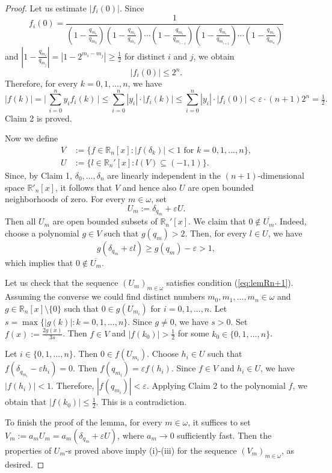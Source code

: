 \documentclass[preprint,11pt]{elsarticle}
\theoremstyle{definition}
\theoremstyle{remark}
\numberwithin{equation}{section}
\numberwithin{theorem}{section}
\newcommand{\e}{\varepsilon}
\newcommand{\w}{\omega}
\newcommand{\IR}{\mathbb{R}}
\def\om{\omega}
\begin{document}
\begin{proof}
Let us estimate $|f_i(0)|$. Since
\[
f_i(0) =\frac{1}
{(1-\frac{q_{m_i}}{q_{m_0}})(1-\frac{q_{m_i}}{q_{m_1}})\cdots(1-\frac{q_{m_i}}{ q_{m_{i-1}}})(1-\frac{q_{m_i}}{q_{m_{i+1}}})\cdots(1-\frac{q_{m_i}}{q_{m_{n}}})}
\]
and $|1-\tfrac{q_{m_i}}{q_{m_j}}|=|1-2^{m_i-m_j}|\geq \frac{1}{2}$ for distinct $i$ and $j$, we obtain
\[
|f_i(0)|\leq 2^{n}.
\]
Therefore, for every $k=0,1,...,n$, we have
\[
|f(k)| = \Big|\, \sum_{i=0}^n y_i f_i(k) \,\Big| \leq \sum_{i=0}^n |y_i| \cdot|f_i(k)| \leq \sum_{i=0}^n |y_i|\cdot |f_i(0)| < \e \cdot (n+1) 2^n
= \tfrac{1}{2}.
\]
Claim 2 is proved.
\smallskip

Now we define
\begin{align*}
V  &:= \big\{ f\in \IR_n[x] : |f(\delta_k)|<1 \text{ for }k=0,1,...,n\big\},
\\
U &:= \big\{ l\in \IR_n'[x] : l(V) \subseteq (-1,1) \big\}.
\end{align*}
Since, by Claim 1,  $\delta_0,\dots,\delta_n$ are linearly independent in the $(n+1)$-dimensional space $\IR'_n[x]$, it follows that $V$ and hence also $U$ are open bounded neighborhoods of zero. For every $m\in\w$, set
\[
U_m := \delta_{q_m} + \e U.
\]
Then all $U_m$ are open bounded subsets of $\IR_n'[x]$. We claim that $0\not\in\overline{U_m}$. Indeed, choose a polynomial $g\in V$ such that $g(q_m)>2$. Then, for every $l\in U$, we have
\[
g(\delta_{q_m} + \e l)\geq g(q_m)-\e>1,
\]
which implies that $0\not\in\overline{U_m}$.

Let us check that the sequence $(U_m)_{m\in\om}$ satisfies condition (\ref{eq:lemRn+1}).
Assuming the converse we could find distinct numbers $m_0,m_1,...,m_n\in\w$ and $g\in \IR_n[x]\setminus\{0\}$ such that $0\in g(U_{m_i})$ for $i=0,1,...,n$.
Let $s=\max \{|g(k)|:k=0,1,...,n\}$. Since $g\neq 0$, we have $s>0$. Set $f(x):= \tfrac{2g(x)}{3s}$.
Then $f\in V$ and $|f(k_0)|>\tfrac{1}{2}$ for some $k_0\in \{0,1,...,n\}$.

Let $i\in\{0,1,...,n\}$. Then $0\in f(U_{m_i})$. Choose $h_i\in U$ such that $f(\delta_{q_{m_i}}-\e h_i)=0$. Then $f(q_{m_i})=\e f(h_i)$. Since $f\in V$ and $h_i\in U$, we have $|f(h_i)|< 1$. Therefore, $|f(q_{m_i})|<\e$. Applying Claim 2 to the polynomial $f$, we obtain  that $|f(k_0)|\leq \tfrac{1}{2}$. This is a contradiction.
\smallskip

To finish the proof of the lemma, for every $m\in\w$,  it suffices to set $V_m:= a_m U_m = a_m(\delta_{q_m} + \e U)$, where $a_m\to 0$ sufficiently fast. Then the properties of $U_m$-s proved above imply (i)-(iii) for the sequence  $(V_m)_{m\in \w}$, as desired.
\end{proof}
\end{document}
